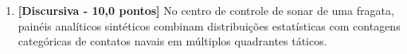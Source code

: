 \begin{enumerate}[label=\textbf{Q\arabic*.}]
\begin{itemize}[leftmargin=*]
    \item \textbf{Protótipo:}\newline
    \\\\\\\\\\\\\\
\end{itemize}



\vspace{0.5cm}

\item \textbf{[Discursiva - 10,0 pontos]} No centro de controle de sonar de uma fragata, painéis analíticos sintéticos combinam distribuições estatísticas com contagens categóricas de contatos navais em múltiplos quadrantes táticos.


\end{enumerate}
